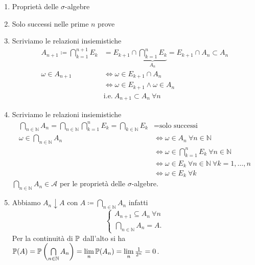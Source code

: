 \begin{enumerate}
	\item Proprietà delle $\sigma $-algebre
	\item Solo successi nelle prime $n$ prove
	\item Scriviamo le relazioni insiemistiche
	\begin{align*}
		A_{n+1} \coloneqq \bigcap\limits _{k=1}^{n+1} E_{k} & =E_{k+1} \cap \underbrace{\bigcap\limits _{k=1}^{n} E_{k}}_{A_{n}} =E_{k+1} \cap A_{n} \subset A_{n}\\
		\omega \in A_{n+1} & \iff \omega \in E_{k+1} \cap A_{n}\\
		 & \iff \omega \in E_{k+1} \land \omega \in A_{n}\\
		 & \text{i.e.} \ A_{n+1} \subset A_{n} \ \forall n
	\end{align*}
	\item Scriviamo le relazioni insiemistiche
	\begin{align*}
		\bigcap\limits _{n\in \mathbb{N}} A_{n} =\bigcap\limits _{n\in \mathbb{N}}\bigcap\limits _{k=1}^{n} E_{k} =\bigcap\limits _{k\in \mathbb{N}} E_{k} & =\text{solo successi}\\
		\omega \in \bigcap\limits _{n\in \mathbb{N}} A_{n} & \iff \omega \in A_{n} \ \forall n\in \mathbb{N}\\
		 & \iff \omega \in \bigcap\limits _{k=1}^{n} E_{k} \ \forall n\in \mathbb{N}\\
		 & \iff \omega \in E_{k} \ \forall n\in \mathbb{N} \ \forall k=1,\dots ,n\\
		 & \iff \omega \in E_{k} \ \forall k
	\end{align*}
	$\bigcap\limits _{n\in \mathbb{N}} A_{n} \in \mathcal{A}$ per le proprietà delle $\sigma $-algebre.
	\item Abbiamo $A_{n} \downarrow A$ con $A\coloneqq \bigcap\limits _{n\in \mathbb{N}} A_{n}$ infatti
	\[
		\begin{cases}
			A_{n+1} \subseteq A_{n} \ \forall n\\
			\bigcap_{n\in \mathbb{N}} A_{n} =A.
		\end{cases}
	\]
	Per la continuità di $\mathbb{P}$ dall'alto si ha $\mathbb{P}(A) =\mathbb{P}\left(\bigcap\limits _{n\in \mathbb{N}} A_{n}\right) =\lim\limits _{n}\mathbb{P}(A_{n}) =\lim\limits _{n}\frac{1}{2^{n}} =0$.
\end{enumerate}

\Soluzione


